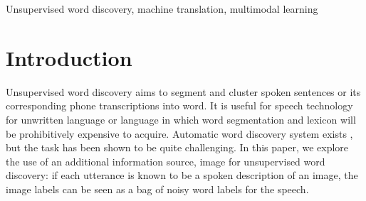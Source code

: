 \documentclass[journal]{IEEEtran}
\begin{document}
\begin{IEEEkeywords}
Unsupervised word discovery, machine translation, multimodal learning
\end{IEEEkeywords}






%
\IEEEpeerreviewmaketitle



\section{Introduction}
Unsupervised word discovery aims to segment and cluster spoken sentences or its corresponding phone transcriptions into word. It is useful for speech technology for unwritten language or language in which word segmentation and lexicon will be prohibitively expensive to acquire. Automatic word discovery system exists \cite{Bharadwaj2013, Rasanen2015, Kamper2017}, but the task has been shown to be quite challenging. In this paper, we explore the use of an additional information source, image for unsupervised word discovery: if each utterance is known to be a spoken description of an image, the image labels can be seen as a bag of noisy word labels for the speech.  


% 
% 
% 
% 


\end{document}
